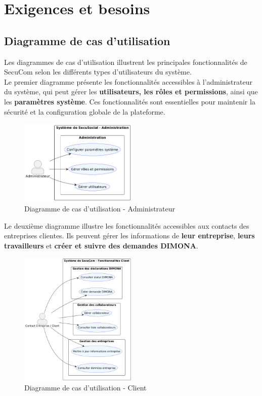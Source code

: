 \chapter{Exigences et besoins}

\section{Diagramme de cas d'utilisation}

Les diagrammes de cas d'utilisation illustrent les principales fonctionnalités de SecuCom selon les différents types d'utilisateurs du système.\\

\noindent Le premier diagramme présente les fonctionnalités accessibles à l'administrateur du système, qui peut gérer les \textbf{utilisateurs, les rôles et permissions}, ainsi que les \textbf{paramètres système}. Ces fonctionnalités sont essentielles pour maintenir la sécurité et la configuration globale de la plateforme.

\vspace{1cm}
\begin{figure}[h]
\centering
\includegraphics[width=0.5\textwidth]{AdminUC.png}
\caption{Diagramme de cas d'utilisation - Administrateur}
\end{figure}

\newpage

\noindent Le deuxième diagramme illustre les fonctionnalités accessibles aux contacts des entreprises clientes. Ils peuvent gérer les informations de \textbf{leur entreprise}, \textbf{leurs travailleurs} et \textbf{créer et suivre des demandes DIMONA}.

\vspace{0.5cm}
\begin{figure}[h]
\centering
\includegraphics[width=0.5\textwidth]{ClientUC.png}
\caption{Diagramme de cas d'utilisation - Client}
\end{figure}

